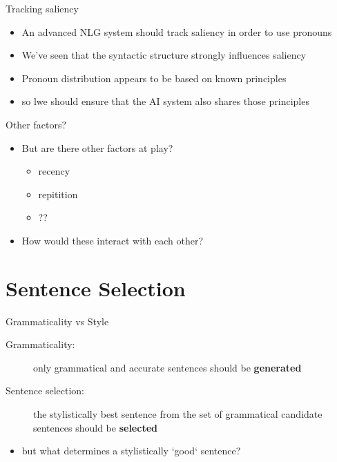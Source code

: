 \documentclass[10pt, compress]{beamer}
\begin{document}
\begin{frame}{Tracking saliency}
	\begin{itemize}
		\item An advanced NLG system should track saliency in order to use pronouns
		\item We've seen that the syntactic structure strongly influences saliency \pause
		\item Pronoun distribution appears to be based on known principles
		\item so lwe should ensure that the AI system also shares those principles
	\end{itemize}
\end{frame}

\begin{frame}{Other factors?}
	\begin{itemize}
		\item But are there other factors at play? \pause
		\begin{itemize}
			\item recency
			\item repitition
			\item ?? \pause
		\end{itemize}
		\item How would these interact with each other?
	\end{itemize}
\end{frame}


\section{Sentence Selection}
\begin{frame}{Grammaticality vs Style}
    \begin{description}
        \item[Grammaticality:] only grammatical and accurate sentences should be {\bf generated}
        \item[Sentence selection:] the stylistically best sentence from the set of grammatical candidate sentences should be {\bf selected} \pause
    \end{description}
    \begin{itemize}
        \item but what determines a stylistically `good` sentence?
    \end{itemize}
    
\end{frame}
\end{document}

